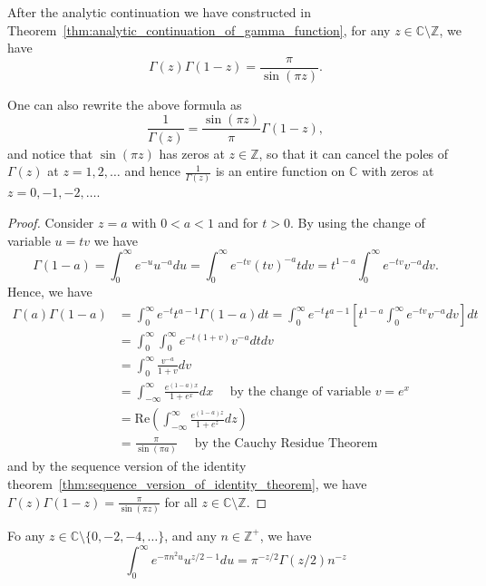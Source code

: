 \documentclass{elegantbook}
\begin{document}
\begin{theorem}
  After the analytic continuation we have constructed in Theorem~\ref{thm:analytic_continuation_of_gamma_function}, for any $z\in\mathbb{C}\setminus \mathbb{Z}$, we have
  \[
    \Gamma(z)\Gamma(1-z) = \frac{\pi}{\sin(\pi z)}.
  \]
\end{theorem}

\begin{note}
  One can also rewrite the above formula as
  \[
    \frac{1}{\Gamma(z)} = \frac{\sin(\pi z)}{\pi} \Gamma(1-z),
  \]
  and notice that $\sin(\pi z)$ has zeros at $z\in\mathbb{Z}$, so that it can cancel the poles of $\Gamma(z)$ at $z=1,2,\ldots$ and hence $\frac{1}{\Gamma(z)}$ is an entire function on $\mathbb{C}$ with zeros at $z=0,-1,-2,\ldots$.
\end{note}

\begin{proof}
  Consider $z=a$ with $0<a<1$ and for $t>0$. By using the change of variable $u=tv$ we have
  \[
    \Gamma(1-a) = \int_{0}^{\infty} e^{-u} u^{-a} du = \int_{0}^{\infty} e^{-tv} (tv)^{-a} t dv = t^{1-a} \int_{0}^{\infty} e^{-tv} v^{-a} dv.
  \]
  Hence, we have
  \[
  \begin{aligned}
    \Gamma(a)\Gamma(1-a) &= \int_{0}^{\infty} e^{-t} t^{a-1} \Gamma(1-a) dt = \int_{0}^{\infty} e^{-t} t^{a-1} \left[ t^{1-a} \int_{0}^{\infty} e^{-tv} v^{-a} dv \right] dt \\
    &= \int_{0}^{\infty} \int_{0}^{\infty} e^{-t(1+v)} v^{-a} dt dv \\
    &= \int_{0}^{\infty} \frac{v^{-a}}{1+v} dv \\
    &= \int_{-\infty}^{\infty} \frac{e^{(1-a)x}}{1+e^x} dx \quad \text{ by the change of variable } v=e^x \\
    &= \mathrm{Re} \left( \int_{-\infty}^{\infty} \frac{e^{(1-a)z}}{1+e^z} dz \right) \\
    &= \frac{\pi}{\sin(\pi a)} \quad \text{ by the Cauchy Residue Theorem }
  \end{aligned}
  \]
  and by the sequence version of the identity theorem~\ref{thm:sequence_version_of_identity_theorem}, we have $\Gamma(z)\Gamma(1-z) = \frac{\pi}{\sin(\pi z)}$ for all $z\in\mathbb{C}\setminus \mathbb{Z}$.
\end{proof}

\begin{theorem}
  Fo any $z\in\mathbb{C}\setminus\{0,-2,-4,\ldots\}$, and any $n\in\mathbb{Z}^+$, we have
  \[
    \int_{0}^{\infty} e^{-\pi n^2 u }u^{z/2 - 1} du = \pi^{-z/2} \Gamma(z/2) n^{-z}
  \]
\end{theorem}
\end{document}
